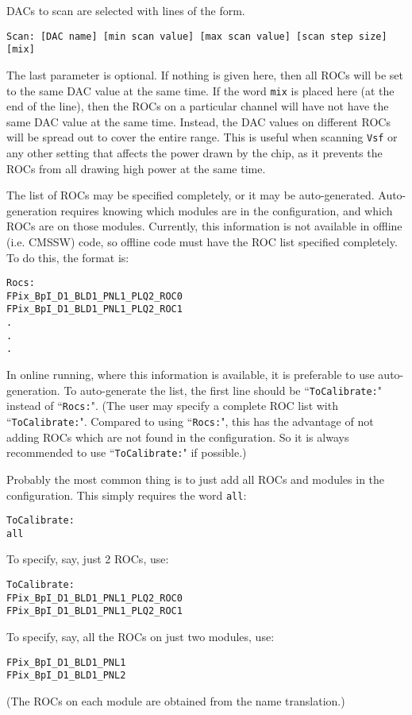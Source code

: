 DACs to scan are selected with lines of the form.
\begin{verbatim}
Scan: [DAC name] [min scan value] [max scan value] [scan step size] [mix]
\end{verbatim}
The last parameter is optional.  If nothing is given here, then all ROCs will be set to the same DAC value at the same time.  If the word \verb|mix| is placed here (at the end of the line), then the ROCs on a particular channel will have not have the same DAC value at the same time.  Instead, the DAC values on different ROCs will be spread out to cover the entire range.  This is useful when scanning \verb|Vsf| or any other setting that affects the power drawn by the chip, as it prevents the ROCs from all drawing high power at the same time.

The list of ROCs may be specified completely, or it may be auto-generated.  
Auto-generation requires knowing which modules are in the configuration, and 
which ROCs are on those modules.  Currently, this information is not 
available in offline (i.e. CMSSW) code, so offline code must have the 
ROC list specified completely.  To do this, the format is:
\begin{verbatim}
Rocs:
FPix_BpI_D1_BLD1_PNL1_PLQ2_ROC0
FPix_BpI_D1_BLD1_PNL1_PLQ2_ROC1
.
.
.
\end{verbatim}
In online running, where this information is available, it is preferable 
to use auto-generation.  To auto-generate the list, the first line should 
be ``\verb|ToCalibrate:|" instead of ``\verb|Rocs:|".  (The user may 
specify a complete ROC list with ``\verb|ToCalibrate:|".  Compared to 
using ``\verb|Rocs:|", this has the advantage of not adding ROCs which 
are not found in the configuration.  So it is always recommended to 
use ``\verb|ToCalibrate:|" if possible.)

Probably the most common thing is to just add all ROCs and modules in 
the configuration. This simply requires the word \verb|all|:
\begin{verbatim}
ToCalibrate:
all
\end{verbatim}

To specify, say, just 2 ROCs, use:
\begin{verbatim}
ToCalibrate:
FPix_BpI_D1_BLD1_PNL1_PLQ2_ROC0
FPix_BpI_D1_BLD1_PNL1_PLQ2_ROC1
\end{verbatim}

To specify, say, all the ROCs on just two modules, use:
\begin{verbatim}
FPix_BpI_D1_BLD1_PNL1
FPix_BpI_D1_BLD1_PNL2
\end{verbatim}
(The ROCs on each module are obtained from the name translation.)

